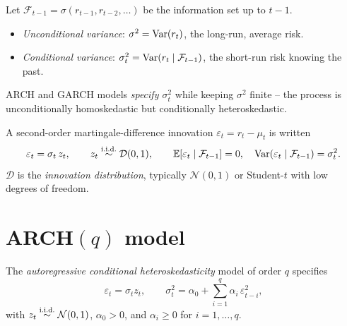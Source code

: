 \begin{rembox}
Let $\mathcal F_{t-1} = \sigma(r_{t-1}, r_{t-2}, \dots)$ be the
information set up to $t - 1$.
\begin{itemize}
  \item \emph{Unconditional variance}:
        $\sigma^2 = \mathrm{Var}(r_t)$, the long-run, average risk.
  \item \emph{Conditional variance}:
        $\sigma_t^2 = \mathrm{Var}(r_t \mid \mathcal F_{t-1})$, the
        short-run risk knowing the past.
\end{itemize}
ARCH and GARCH models \emph{specify $\sigma_t^2$} while keeping
$\sigma^2$ finite -- the process is unconditionally homoskedastic
but conditionally heteroskedastic.
\end{rembox}

\begin{defbox}
\label{def:mean-var}
A second-order martingale-difference innovation
$\varepsilon_t = r_t - \mu_t$ is written
\[
  \varepsilon_t = \sigma_t\, z_t,
  \qquad
  z_t \overset{\text{i.i.d.}}{\sim} \mathcal D(0, 1),
  \qquad
  \mathbb{E}[\varepsilon_t \mid \mathcal F_{t-1}] = 0,
  \quad
  \mathrm{Var}(\varepsilon_t \mid \mathcal F_{t-1}) = \sigma_t^2.
\]
$\mathcal D$ is the \emph{innovation distribution}, typically
$\mathcal N(0, 1)$ or Student-$t$ with low degrees of freedom.
\end{defbox}

\section{ARCH$(q)$ model}
\label{sec:arch}

\begin{defbox}
\label{def:arch}
The \emph{autoregressive conditional heteroskedasticity} model of
order $q$ specifies
\[
  \varepsilon_t = \sigma_t z_t,
  \qquad
  \sigma_t^2 = \alpha_0
              + \sum_{i = 1}^{q} \alpha_i\, \varepsilon_{t-i}^2,
\]
with $z_t \overset{\text{i.i.d.}}{\sim} \mathcal N(0, 1)$, $\alpha_0 > 0$, and
$\alpha_i \geq 0$ for $i = 1, \dots, q$.
\end{defbox}

